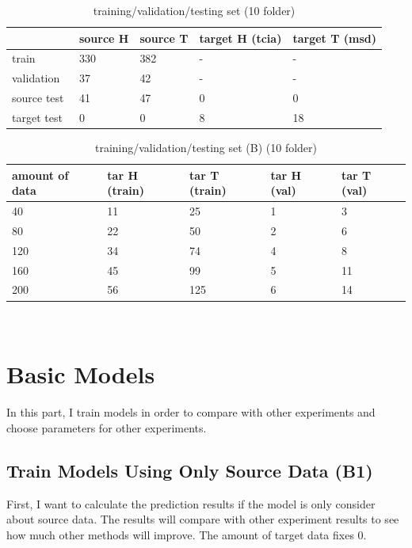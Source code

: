  \begin{table}[H]
\centering
\caption{training/validation/testing set (10 folder)}
\begin{tabular}{|l|l|l|l|l|} 
\hline
~            & source H & source T & target H (tcia) & target T (msd)  \\ 
\hline
train        & 330      & 382      & -               & -               \\ 
\hline
validation   & 37       & 42       & -               & -               \\ 
\hline
source test  & 41       & 47       & 0               & 0               \\ 
\hline
target test~ & 0        & 0        & 8               & 18              \\
\hline
\end{tabular}
\end{table}
\begin{table}[H]
\centering 
\caption{training/validation/testing set (B) (10 folder)}
\begin{tabular}{|l|l|l|l|l|} 
\hline
amount of data   & tar H (train) & tar T (train) & tar H (val) & tar T (val)  \\ 
\hline
40       & 11      & 25      & 1               & 3               \\ 
\hline
80 & 22       & 50       & 2               & 6               \\ 
\hline
120 & 34       & 74       & 4               & 8               \\ 
\hline
160 & 45        & 99        & 5               & 11              \\
\hline
200 & 56       & 125       & 6               & 14               \\ 
\hline
\end{tabular}
\end{table}
 ~\\
\section{Basic Models}
In this part, I train models in order to compare with other experiments and choose parameters for other experiments.
\subsection{Train Models Using Only Source Data (B1)}
First, I want to calculate the prediction results if the model is only consider about source data. The results will compare with other experiment results to see how much other methods will improve. The amount of target data fixes 0.
